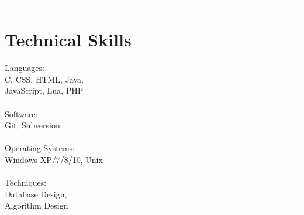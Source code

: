 \noindent\rule{0.9\hsize}{0.4pt}
\section{\normalsize{Technical Skills}}

Languages:\\
C, CSS, HTML, Java,\\
JavaScript, Lua, PHP\\
\\
Software:\\
Git, Subversion\\
\\
Operating Systems:\\
Windows XP/7/8/10, Unix\\
\\
Techniques:\\
Database Design,\\
Algorithm Design